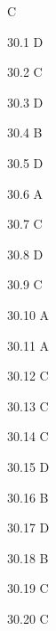 \begin{Solution}{30}
C
\end{Solution}
\begin{Solution}{30.{1}}
D
\end{Solution}
\begin{Solution}{30.{2}}
C
\end{Solution}
\begin{Solution}{30.{3}}
D
\end{Solution}
\begin{Solution}{30.{4}}
B
\end{Solution}
\begin{Solution}{30.{5}}
D
\end{Solution}
\begin{Solution}{30.{6}}
A
\end{Solution}
\begin{Solution}{30.{7}}
C
\end{Solution}
\begin{Solution}{30.{8}}
D
\end{Solution}
\begin{Solution}{30.{9}}
C
\end{Solution}
\begin{Solution}{30.{10}}
A
\end{Solution}
\begin{Solution}{30.{11}}
A
\end{Solution}
\begin{Solution}{30.{12}}
C
\end{Solution}
\begin{Solution}{30.{13}}
C
\end{Solution}
\begin{Solution}{30.{14}}
C
\end{Solution}
\begin{Solution}{30.{15}}
D
\end{Solution}
\begin{Solution}{30.{16}}
B
\end{Solution}
\begin{Solution}{30.{17}}
D
\end{Solution}
\begin{Solution}{30.{18}}
B
\end{Solution}
\begin{Solution}{30.{19}}
C
\end{Solution}
\begin{Solution}{30.{20}}
C
\end{Solution}

